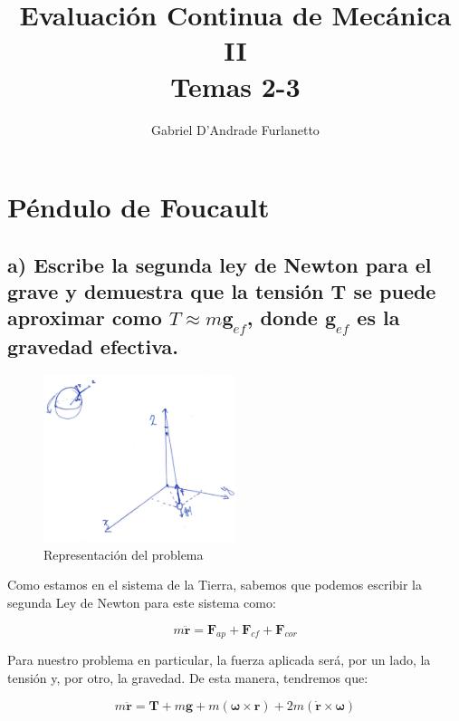\documentclass[a4paper,12pt]{article}
\begin{document}
\title{Evaluación Continua de Mecánica II\\ Temas 2-3}
\author{Gabriel D'Andrade Furlanetto}
\maketitle 

\section{Péndulo de Foucault}

\subsection*{a) Escribe la segunda ley de Newton para el grave y demuestra que la tensión $\boldsymbol{T}$ se puede aproximar como $T \approx m\boldsymbol{g}_{ef}$, donde $\boldsymbol{g}_{ef}$ es la gravedad efectiva.}

\begin{figure}[H]
  \centering
  \includegraphics[width=0.5\textwidth]{foucault.jpg}
  \caption{Representación del problema}
  \label{fucas}
\end{figure}


Como estamos en el sistema de la Tierra, sabemos que podemos escribir la segunda Ley de Newton para este sistema como:

\begin{equation}
  m\ddot{\boldsymbol{r}} = \boldsymbol{F}_{ap} + \boldsymbol{F}_{cf} + \boldsymbol{F}_{cor}
\end{equation}

Para nuestro problema en particular, la fuerza aplicada será, por un lado, la tensión y, por otro, la gravedad. De esta manera, tendremos que:

\begin{equation}
  m \ddot{\boldsymbol{r}} = \boldsymbol{T} + m\boldsymbol{g} + m(\boldsymbol{\omega} \times \boldsymbol{r}) + 2m (\dot{\boldsymbol{r}} \times \boldsymbol{\omega})
\end{equation}
\end{document}
